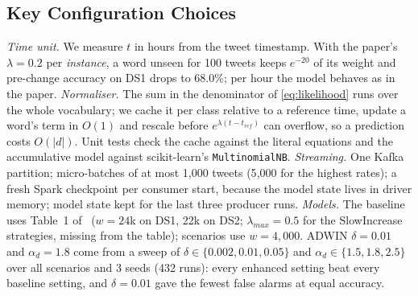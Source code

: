 \documentclass[conference]{IEEEtran}
\begin{document}
\begin{table}[t]
\centering
\footnotesize
\caption{Tools and versions.}
\label{tab:tools}
\end{table}

\subsection{Key Configuration Choices}
\emph{Time unit.} We measure $t$ in hours from the tweet timestamp. With the paper's
$\lambda = 0.2$ per \emph{instance}, a word unseen for 100 tweets keeps $e^{-20}$ of its weight
and pre-change accuracy on DS1 drops to 68.0\%; per hour the model behaves as in the paper.
\emph{Normaliser.} The sum in the denominator of \eqref{eq:likelihood} runs over the whole
vocabulary; we cache it per class relative to a reference time, update a word's term in $O(1)$
and rescale before $e^{\lambda(t - t_{ref})}$ can overflow, so a prediction costs $O(|d|)$. Unit
tests check the cache against the literal equations and the accumulative model against
scikit-learn's \texttt{MultinomialNB}.
\emph{Streaming.} One Kafka partition; micro-batches of at most 1{,}000 tweets (5{,}000 for the
highest rates); a fresh Spark checkpoint per consumer start, because the model state lives in
driver memory; model state kept for the last three producer runs.
\emph{Models.} The baseline uses Table~1 of~\cite{iosifidis2017} ($w = 24$k on DS1, 22k on DS2;
$\lambda_{max} = 0.5$ for the SlowIncrease strategies, missing from the table); scenarios use
$w = 4{,}000$. ADWIN $\delta = 0.01$ and $\alpha_d = 1.8$ come from a sweep of $\delta \in
\{0.002, 0.01, 0.05\}$ and $\alpha_d \in \{1.5, 1.8, 2.5\}$ over all scenarios and 3 seeds
(432 runs): every enhanced setting beat every baseline setting, and $\delta = 0.01$ gave the
fewest false alarms at equal accuracy.
\end{document}
